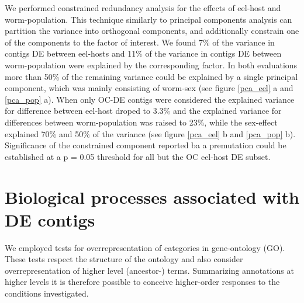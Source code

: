 We performed constrained redundancy analysis for the effects of
eel-host and worm-population. This technique similarly to principal
components analysis can partition the variance into orthogonal
components, and additionally constrain one of the components to the
factor of interest. We found 7\% of the variance in contigs DE between
eel-hosts and 11\% of the variance in contigs DE between
worm-population were explained by the corresponding factor. In both
evaluations more than 50\% of the remaining variance could be
explained by a single principal component, which was mainly consisting
of worm-sex (see figure \ref{pca_eel} a and \ref{pca_pop} a). When
only OC-DE contigs were considered the explained variance for
difference between eel-host droped to 3.3\% and the explained variance
for differences between worm-population was raised to 23\%, while the
sex-effect explained 70\% and 50\% of the variance (see figure
\ref{pca_eel} b and \ref{pca_pop} b). Significance of the constrained
component reported ba a premutation could be established at a p = 0.05
threshold for all but the OC eel-host DE subset.



\afterpage{\clearpage}

\section{Biological processes associated with DE contigs}

We employed tests for overrepresentation of categories in
gene-ontology (GO). These tests respect the structure of the ontology
and also consider overrepresentation of higher level (ancestor-)
terms. Summarizing annotations at higher levels it is therefore
possible to conceive higher-order responses to the conditions
investigated.

